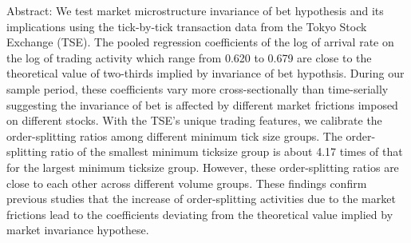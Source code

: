 \documentclass[12pt,a4paper]{article}
\begin{document}
\newpage
Abstract: We test market microstructure invariance of bet hypothesis and its implications using the tick-by-tick transaction data from the Tokyo Stock Exchange (TSE). The pooled regression coefficients of the log of arrival rate on the log of trading activity which range from 0.620 to 0.679 are close to the theoretical value of two-thirds implied by invariance of bet hypothsis. During our sample period, these coefficients vary more cross-sectionally than time-serially suggesting the invariance of bet is affected by different market frictions imposed on different stocks. With the TSE's unique trading features, we calibrate the order-splitting ratios among different minimum tick size groups. The order-splitting ratio of the smallest minimum ticksize group is about 4.17 times of that for the largest minimum ticksize group. However, these order-splitting ratios are close to each other across different volume groups. These findings confirm previous studies that the increase of order-splitting activities due to the market frictions lead to the coefficients deviating from the theoretical value implied by market invariance hypothese.       
\end{document}
